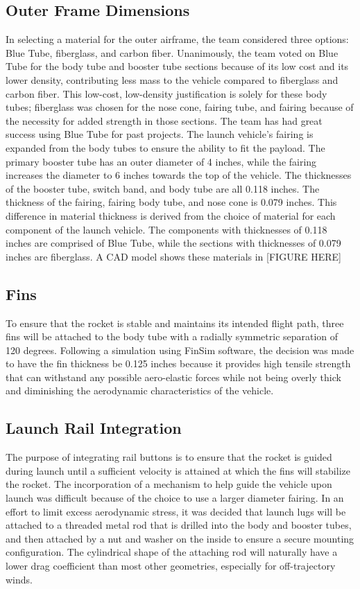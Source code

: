    \subsection{Outer Frame Dimensions}
In selecting a material for the outer airframe, the team considered three options: Blue Tube, fiberglass, and carbon fiber. Unanimously, the team voted on Blue Tube for the body tube and booster tube sections because of its low cost and its lower density, contributing less mass to the vehicle compared to fiberglass and carbon fiber. This low-cost, low-density justification is solely for these body tubes; fiberglass was chosen for the nose cone, fairing tube, and fairing because of the necessity for added strength in those sections. The team has had great success using Blue Tube for past projects. The launch vehicle’s fairing is expanded from the body tubes to ensure the ability to fit the payload. The primary booster tube has an outer diameter of 4 inches, while the fairing increases the diameter to 6 inches towards the top of the vehicle. The thicknesses of the booster tube, switch band, and body tube are all 0.118 inches. The thickness of the fairing, fairing body tube, and nose cone is 0.079 inches. This difference in material thickness is derived from the choice of material for each component of the launch vehicle. The components with thicknesses of 0.118 inches are comprised of Blue Tube, while the sections with thicknesses of 0.079 inches are fiberglass. A CAD model shows these materials in [FIGURE HERE]


    \subsection{Fins}
To ensure that the rocket is stable and maintains its intended flight path, three fins will be attached to the body tube with a radially symmetric separation of 120 degrees. Following a simulation using FinSim software, the decision was made to have the fin thickness be 0.125 inches because it provides high tensile strength that can withstand any possible aero-elastic forces while not being overly thick and diminishing the aerodynamic characteristics of the vehicle. 


    \subsection{Launch Rail Integration}
The purpose of integrating rail buttons is to ensure that the rocket is guided during launch until a sufficient velocity is attained at which the fins will stabilize the rocket. The incorporation of a mechanism to help guide the vehicle upon launch was difficult because of the choice to use a larger diameter fairing. In an effort to limit excess aerodynamic stress, it was decided that launch lugs will be attached to a threaded metal rod that is drilled into the body and booster tubes, and then attached by a nut and washer on the inside to ensure a secure mounting configuration. The cylindrical shape of the attaching rod will naturally have a lower drag coefficient than most other geometries, especially for off-trajectory winds.


